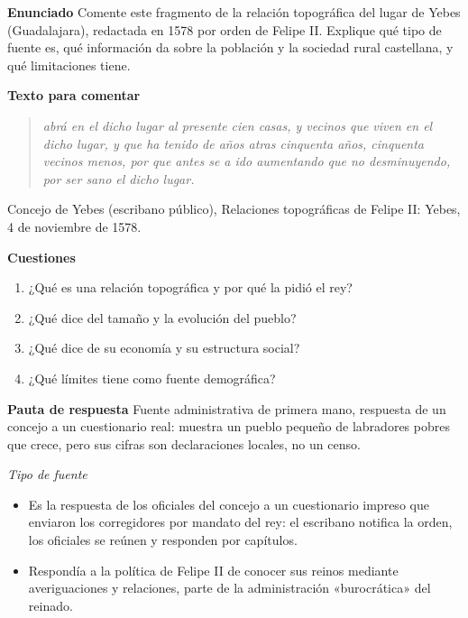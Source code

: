 \documentclass{book}
\begin{document}
\begin{tcolorbox}[title={Ejercicio resuelto}, studiumworked, breakable]

\noindent\textbf{Enunciado}
Comente este fragmento de la relación topográfica del lugar de Yebes (Guadalajara), redactada en 1578 por orden de Felipe II. Explique qué tipo de fuente es, qué información da sobre la población y la sociedad rural castellana, y qué limitaciones tiene.


\noindent\textbf{Texto para comentar}

\begin{quote}
\itshape abrá en el dicho lugar al presente cien casas, y vecinos que viven en el dicho lugar, y que ha tenido de años atras cinquenta años, cinquenta vecinos menos, por que antes se a ido aumentando que no desminuyendo, por ser sano el dicho lugar.
\end{quote}
{\noindent\footnotesize Concejo de Yebes (escribano público), Relaciones topográficas de Felipe II: Yebes, 4 de noviembre de 1578.\par}

\noindent\textbf{Cuestiones}
\begin{enumerate}
\item ¿Qué es una relación topográfica y por qué la pidió el rey?
\item ¿Qué dice del tamaño y la evolución del pueblo?
\item ¿Qué dice de su economía y su estructura social?
\item ¿Qué límites tiene como fuente demográfica?
\end{enumerate}

\noindent\textbf{Pauta de respuesta}
Fuente administrativa de primera mano, respuesta de un concejo a un cuestionario real: muestra un pueblo pequeño de labradores pobres que crece, pero sus cifras son declaraciones locales, no un censo.


\noindent\textit{Tipo de fuente}
\begin{itemize}
\item Es la respuesta de los oficiales del concejo a un cuestionario impreso que enviaron los corregidores por mandato del rey: el escribano notifica la orden, los oficiales se reúnen y responden por capítulos.
\item Respondía a la política de Felipe II de conocer sus reinos mediante averiguaciones y relaciones, parte de la administración «burocrática» del reinado.
\end{itemize}


\end{tcolorbox}
\end{document}
